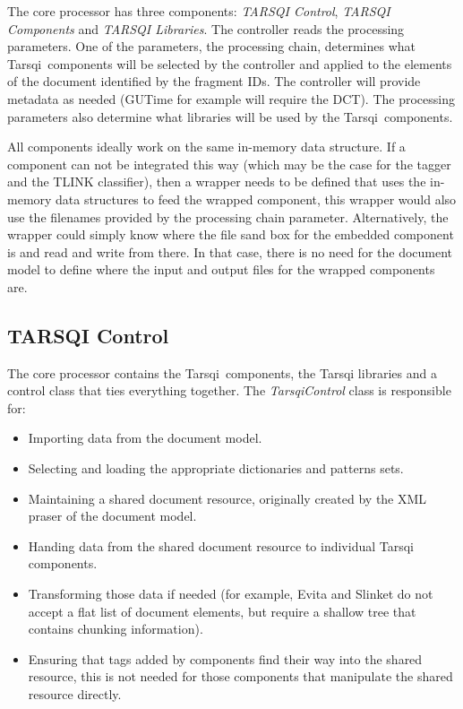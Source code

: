 \documentclass[11pt]{article}
\newcommand{\tarsqi}{T{\sc arsqi}}
\begin{document}
The core processor has three components: {\em TARSQI Control}, {\em TARSQI Components} and {\em TARSQI Libraries}. The controller reads the processing parameters. One of the parameters, the processing chain, determines what \tarsqi\ components will be selected by the controller and applied to the elements of the document identified by the fragment IDs. The controller will provide metadata as needed (GUTime for example will require the DCT). The processing parameters also determine what libraries will be used by the \tarsqi\ components.

All components ideally work on the same in-memory data structure. If a component can not be integrated this way (which may be the case for the tagger and the TLINK classifier), then a wrapper needs to be defined that uses the in-memory data structures to feed the wrapped component, this wrapper would also use the filenames provided by the processing chain parameter. Alternatively, the wrapper could simply know where the file sand box for the embedded component is and read and write from there. In that case, there is no need for the document model to define where the input and output files for the wrapped components are. 


\subsection{TARSQI Control}

The core processor contains the \tarsqi\ components, the \tarsqi{} libraries and a control class that ties everything together. The {\em TarsqiControl} class is responsible for:

\begin{itemize}
\item Importing data from the document model.
\item Selecting and loading the appropriate dictionaries and patterns sets.
\item Maintaining a shared document resource, originally created by the XML praser of the document model.
\item Handing data from the shared document resource to individual Tarsqi components.
\item Transforming those data if needed (for example, Evita and Slinket do not accept a flat list of document elements, but require a shallow tree that contains chunking information).
\item Ensuring that tags added by components find their way into the shared resource, this is not needed for those components that manipulate the shared resource directly.
\end{itemize}
\end{document}
